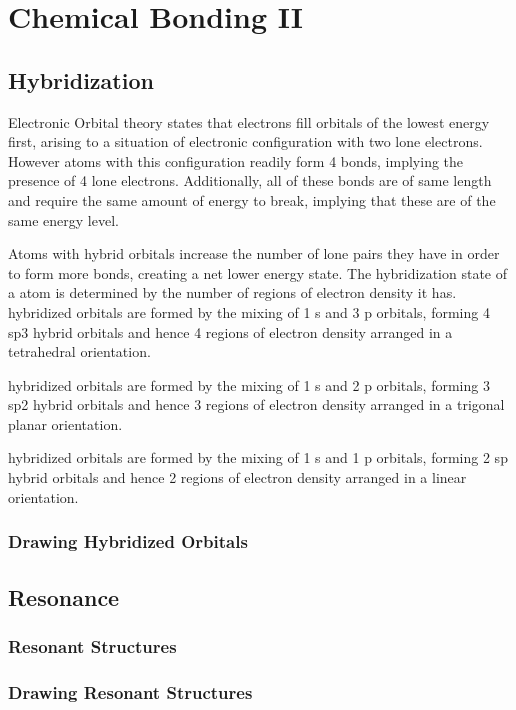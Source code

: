 \documentclass[../main]{subfiles}
\begin{document}
\section{Chemical Bonding II}

\subsection{Hybridization}

Electronic Orbital theory states that electrons fill orbitals of the lowest energy first, arising to a situation of electronic configuration  with two lone electrons. However atoms with this configuration readily form 4 bonds, implying the presence of 4 lone electrons. Additionally, all of these bonds are of same length and require the same amount of energy to break, implying that these are of the same energy level. \\


Atoms with hybrid orbitals increase the number of lone pairs they have in order to form more bonds, creating a net lower energy state. The hybridization state of a atom is determined by the number of regions of electron density it has. \\

 hybridized orbitals are formed by the mixing of 1 s and 3 p orbitals, forming 4 sp3 hybrid orbitals and hence 4 regions of electron density arranged in a tetrahedral orientation.

 hybridized orbitals are formed by the mixing of 1 s and 2 p orbitals, forming 3 sp2 hybrid orbitals and hence 3 regions of electron density arranged in a trigonal planar orientation.

 hybridized orbitals are formed by the mixing of 1 s and 1 p orbitals, forming 2 sp hybrid orbitals and hence 2 regions of electron density arranged in a linear orientation.

\subsubsection{Drawing Hybridized Orbitals}

\subsection{Resonance}

\subsubsection{Resonant Structures}

\subsubsection{Drawing Resonant Structures}
\end{document}
